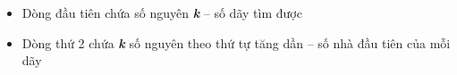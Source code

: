 \begin{itemize}
	\item Dòng đầu tiên chứa số nguyên \textbf{\emph{ k }} – số dãy tìm được
	\item Dòng thứ 2 chứa \textbf{\emph{ k }} số nguyên theo thứ tự tăng dần – số nhà đầu tiên của mỗi dãy
\end{itemize}

\